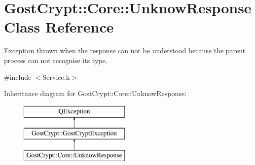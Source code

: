 \hypertarget{class_gost_crypt_1_1_core_1_1_unknow_response}{}\section{Gost\+Crypt\+:\+:Core\+:\+:Unknow\+Response Class Reference}
\label{class_gost_crypt_1_1_core_1_1_unknow_response}


Exception thrown when the response can not be understood because the parent process can not recognise its type.  




{\ttfamily \#include $<$Service.\+h$>$}

Inheritance diagram for Gost\+Crypt\+:\+:Core\+:\+:Unknow\+Response\+:\begin{figure}[H]
\begin{center}
\leavevmode
\includegraphics[height=3.000000cm]{class_gost_crypt_1_1_core_1_1_unknow_response}
\end{center}
\end{figure}
